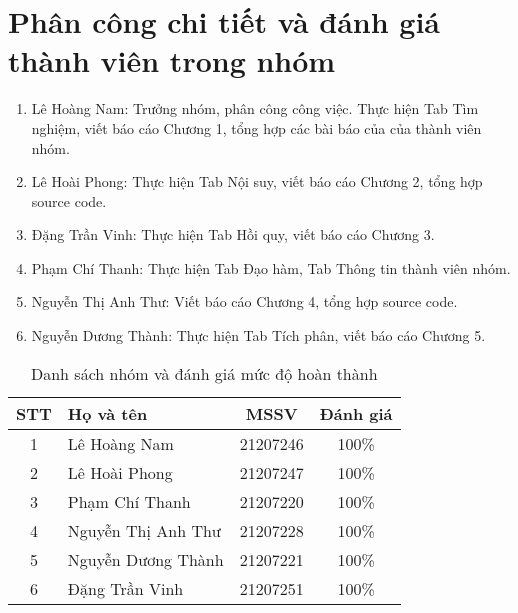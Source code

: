%
\chapter{Phân công chi tiết và đánh giá thành viên trong nhóm}
\label{ch::Annexes}

\begin{enumerate}
    \item Lê Hoàng Nam: Trưởng nhóm, phân công công việc. Thực hiện Tab Tìm nghiệm, viết báo cáo Chương 1, tổng hợp các bài báo của của thành viên nhóm.
    \item Lê Hoài Phong: Thực hiện Tab Nội suy, viết báo cáo Chương 2, tổng hợp source code.
    \item Đặng Trần Vinh: Thực hiện Tab Hồi quy, viết báo cáo Chương 3.
    \item Phạm Chí Thanh: Thực hiện Tab Đạo hàm, Tab Thông tin thành viên nhóm.
    \item Nguyễn Thị Anh Thư: Viết báo cáo Chương 4, tổng hợp source code.
    \item Nguyễn Dương Thành: Thực hiện Tab Tích phân, viết báo cáo Chương 5.
\end{enumerate}

\begin{table}[h]
\caption{Danh sách nhóm và đánh giá mức độ hoàn thành}
\centering
\large
\begin{tabular}{|c|l|c|c|}
\hline
\textbf{STT} & \textbf{Họ và tên} & \textbf{MSSV} & \textbf{Đánh giá} \\ \hline
1 & Lê Hoàng Nam & 21207246 & 100\% \\ \hline
2 & Lê Hoài Phong & 21207247 & 100\% \\ \hline
3 & Phạm Chí Thanh & 21207220 & 100\% \\ \hline
4 & Nguyễn Thị Anh Thư & 21207228 & 100\% \\ \hline
5 & Nguyễn Dương Thành & 21207221 & 100\% \\ \hline
6 & Đặng Trần Vinh & 21207251 & 100\% \\ \hline
\end{tabular}
\end{table}

